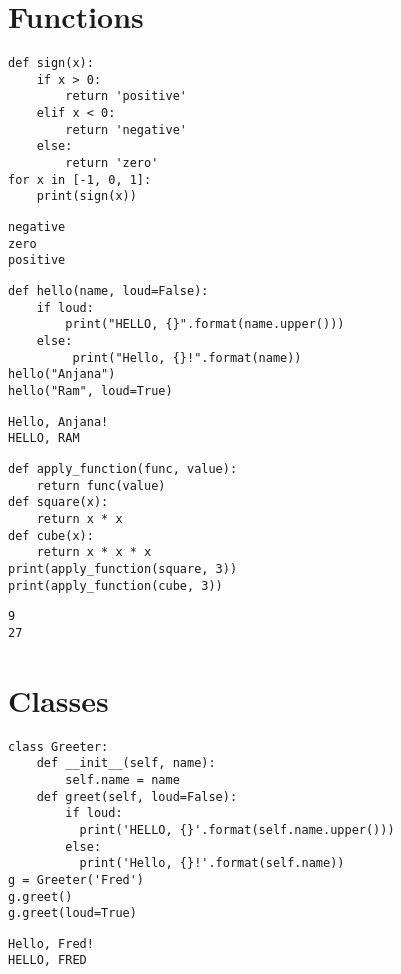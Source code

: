 \section{Functions}
\vspace{-.95cm}
\begin{code}[h]
\begin{lstlisting}
def sign(x):
    if x > 0:
        return 'positive'
    elif x < 0:
        return 'negative'
    else:
        return 'zero'
for x in [-1, 0, 1]:
    print(sign(x))
\end{lstlisting}
\end{code}
\vspace{-1cm}
\begin{verbatim}
negative
zero
positive
\end{verbatim}
\newpage
\vspace{-.95cm}
\begin{code}[h]
\begin{lstlisting}
def hello(name, loud=False):
    if loud:
        print("HELLO, {}".format(name.upper()))
    else:
         print("Hello, {}!".format(name))
hello("Anjana")
hello("Ram", loud=True)
\end{lstlisting}
\end{code}
\vspace{-1cm}
\begin{verbatim}
Hello, Anjana!
HELLO, RAM
\end{verbatim}
\vspace{-.6cm}
\begin{code}[h]
\begin{lstlisting}
def apply_function(func, value):
    return func(value)
def square(x):
    return x * x
def cube(x):
    return x * x * x
print(apply_function(square, 3)) 
print(apply_function(cube, 3))    
\end{lstlisting}
\end{code}
\vspace{-1cm}
\begin{verbatim}
9
27
\end{verbatim}
\section{Classes}
\vspace{-.75cm}
\begin{code}[h]
\begin{lstlisting}
class Greeter:
    def __init__(self, name):
        self.name = name
    def greet(self, loud=False):
        if loud:
          print('HELLO, {}'.format(self.name.upper()))
        else:
          print('Hello, {}!'.format(self.name))
g = Greeter('Fred')
g.greet()
g.greet(loud=True)
\end{lstlisting}
\end{code}
\begin{verbatim}
Hello, Fred!
HELLO, FRED
\end{verbatim}
\newpage

